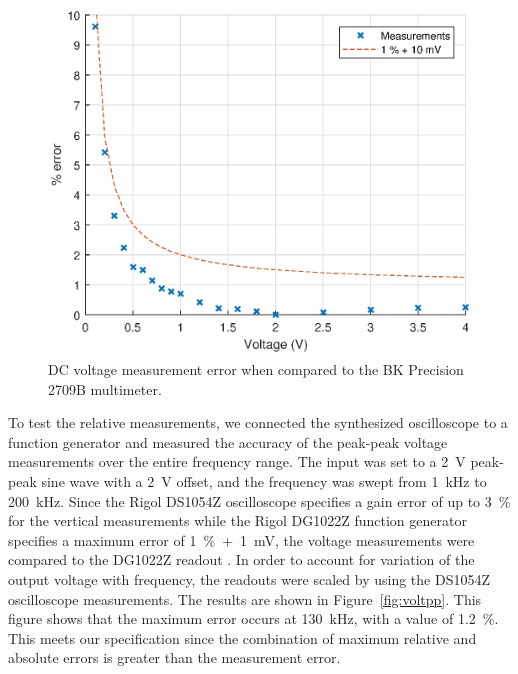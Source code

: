 \documentclass[journal]{IEEEtran}
\begin{document}
\begin{figure}[!htb]
  \centering
  \includegraphics[width=\columnwidth]{test-results/volt.eps}
  \caption{DC voltage measurement error when compared to the BK Precision 2709B multimeter.}
  \label{fig:volt}
\end{figure}

To test the relative measurements, we connected the synthesized oscilloscope to a function generator and measured the accuracy of the peak-peak voltage measurements over the entire frequency range. The input was set to a 2~V peak-peak sine wave with a 2~V offset, and the frequency was swept from 1~kHz to 200~kHz. Since the Rigol DS1054Z oscilloscope specifies a gain error of up to 3~\% for the vertical measurements while the Rigol DG1022Z function generator specifies a maximum error of 1~\%~+~1~mV, the voltage measurements were compared to the DG1022Z readout \cite{ds1054z,dg1022z}. In order to account for variation of the output voltage with frequency, the readouts were scaled by using the DS1054Z oscilloscope measurements. The results are shown in Figure~\ref{fig:voltpp}. This figure shows that the maximum error occurs at 130~kHz, with a value of 1.2~\%. This meets our specification since the combination of maximum relative and absolute errors is greater than the measurement error.
\end{document}

